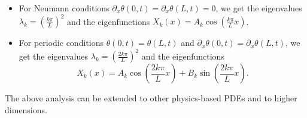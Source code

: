 \begin{itemize}
    \item For Neumann conditions $\partial_x\theta(0,t) = \partial_x\theta(L,t) = 0$, we get the eigenvalues $\lambda_k = \left(\frac{k\pi}{L}\right)^2$ and the eigenfunctions $X_k(x) = A_k \cos \left(\frac{k\pi}{L}x\right)$.
    \item For periodic conditions $\theta(0,t) = \theta(L,t)$ and $\partial_x \theta(0,t) = \partial_x\theta(L,t)$, we get the eigenvalues $\lambda_k = \left(\frac{2k\pi}{L}\right)^2$ and the eigenfunctions 
    \begin{equation*}
        X_k(x) = A_k\cos\left(\frac{2k\pi}{L}x\right) + B_k \sin\left(\frac{2k\pi}{L}x\right).
    \end{equation*}
\end{itemize}
The above analysis can be extended to other physics-based PDEs and to higher dimensions.
